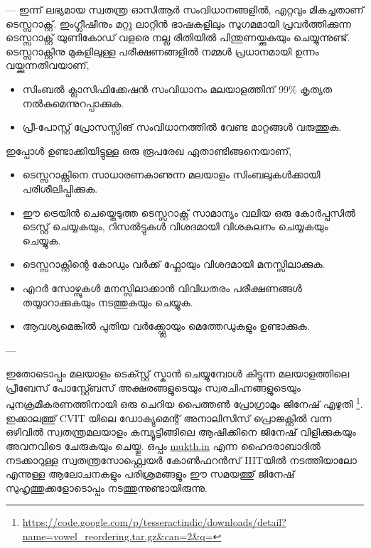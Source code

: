 ---
ഇന്ന് ലഭ്യമായ സ്വതന്ത്ര ഓസിആര്‍ സംവിധാനങ്ങളില്‍, എറ്റവും മികച്ചതാണ് ടെസ്സറാക്റ്റ്. ഇംഗ്ലീഷീനും മറ്റു ലാറ്റിന്‍ ഭാഷകളിലും സുഗമമായി പ്രവര്‍ത്തിക്കുന്ന ടെസ്സറാക്റ്റ് യുണികോഡ് വളരെ നല്ല രീതിയില്‍ പിന്തുണയ്ക്കുകയും ചെയ്യുന്നുണ്ട്. 
ടെസ്സറാക്റ്റിനു മുകളിലുള്ള പരീക്ഷണങ്ങളില്‍ നമ്മള്‍ പ്രധാനമായി ഉന്നം വയ്ക്കുന്നതിവയാണ്,

\begin{itemize}
\item സിംബല്‍ ക്ലാസിഫിക്കേഷന്‍ സംവിധാനം മലയാളത്തിന് 99\% കൃത്യത നല്‍കുമെന്നുറപ്പാക്കുക.
\item പ്രീ-പോസ്റ്റ് പ്രോസസ്സിങ് സംവിധാനത്തില്‍ വേണ്ട മാറ്റങ്ങള്‍ വരുത്തുക. 
\end{itemize}

ഇപ്പോള്‍ ഉണ്ടാക്കിയിട്ടുള്ള ഒരു രൂപരേഖ ഏതാണ്ടിങ്ങനെയാണ്,

\begin{itemize}
\item  ടെസ്സറാക്റ്റിനെ സാധാരണകാണുന്ന മലയാളം സിംബലുകള്‍ക്കായി പരിശീലിപ്പിക്കുക.
\item  ഈ ട്രെയിന്‍ ചെയ്തെടുത്ത ടെസ്സറാക്റ്റ് സാമാന്യം വലിയ ഒരു കോര്‍പ്പസില്‍ ടെസ്റ്റ് ചെയ്യകയും, റിസല്‍ട്ടുകള്‍ വിശദമായി വിശകലനം ചെയ്യകയും ചെയ്യുക.
\item  ടെസ്സറാക്റ്റിന്റെ കോഡും വര്‍ക്ക് ഫ്ലോയും വിശദമായി മനസ്സിലാക്കുക.
\item  എറര്‍ സോഴ്സുകള്‍ മനസ്സിലാക്കാന്‍ വിവിധതരം പരീക്ഷണങ്ങള്‍ തയ്യാറാക്കുകയും നടത്തുകയും ചെയ്യുക.
\item  ആവശ്യമെങ്കില്‍ പുതിയ വര്‍ക്ക്ഫ്ലോയും മെത്തേഡുകളും ഉണ്ടാക്കുക. 
\end{itemize}
---

ഇതോടൊപ്പം മലയാളം ടെക്സ്റ്റ് സ്കാന്‍ ചെയ്യുമ്പോള്‍ കിട്ടുന്ന മലയാളത്തിലെ പ്രീബേസ് പോസ്റ്റ്ബേസ് അക്ഷരങ്ങളുടെയും സ്വരചിഹ്നങ്ങളുടെയും പുനക്രമീകരണത്തിനായി ഒരു ചെറിയ പൈത്തണ്‍ പ്രോഗ്രാമും ജിനേഷ് എഴുതി \footnote{\url{https://code.google.com/p/tesseractindic/downloads/detail?name=vowel_reordering.tar.gz&can=2&q=}}. ഇക്കാലത്തു് CVIT യിലെ ഡോക്യുമെന്റ് അനാലിസിസ് പ്രൊജക്റ്റില്‍ വന്ന ഒഴിവില്‍ സ്വതന്ത്രമലയാളം കമ്പ്യൂട്ടിങ്ങിലെ ആഷിക്കിനെ ജിനേഷ് വിളിക്കുകയും അവനവിടെ ചേരുകയും ചെയ്തു. ഒപ്പം \url{mukth.in} എന്ന ഹൈദരാബാദില്‍ നടക്കാറുള്ള സ്വതന്ത്രസോഫ്റ്റ്വെയര്‍ കോണ്‍ഫറന്‍സ് IIITയില്‍ നടത്തിയാലോ എന്നുള്ള ആലോചനകളും പരിശ്രമങ്ങളും ഈ സമയത്തു് ജിനേഷ് സുഹൃത്തുക്കളോടൊപ്പം നടത്തുന്നുണ്ടായിരുന്നു. 


